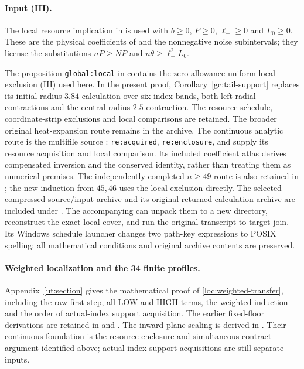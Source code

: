 \documentclass[aop,preprint]{imsart}
\theoremstyle{definition}
\numberwithin{equation}{section}
\begin{document}
\paragraph{Input (III).}
The local resource implication  in
 is used with $b\ge0$, $P\ge0$,
$\ell_-\ge0$ and $L_0\ge0$. These are the physical coefficients of
 and the nonnegative noise subintervals; they license
the substitutions $nP\ge NP$ and $n\theta\ge\ell_-^2L_0$.

The proposition \texttt{global:local} in
contains the zero-allowance uniform local exclusion (III) used here.
In the present proof, Corollary~\ref{gc:tail-support} replaces its
initial radius-$3.84$ calculation over six index bands, both left radial
contractions and the central radius-$2.5$ contraction. The resource
schedule, coordinate-strip exclusions and local comparisons are
retained. The broader original heat-expansion route remains in the archive.
The continuous analytic route is the multifile source
:
\texttt{re:acquired}, \texttt{re:enclosure}, and
 supply its resource acquisition and
local comparison. Its included coefficient atlas derives
compensated inversion and the conserved identity, rather than treating
them as numerical premises. The independently completed $n\ge49$
route is also retained in
;
the new induction from $45,46$ uses the local exclusion directly.
The selected compressed source/input archive and its original returned
calculation archive are included under .
The accompanying  can unpack
them to a new directory, reconstruct the exact local cover, and run
the original transcript-to-target join. Its Windows schedule launcher
changes two path-key expressions to POSIX spelling; all mathematical
conditions and original archive contents are preserved.

\paragraph{Weighted localization and the 34 finite profiles.}
Appendix~\ref{ut:section} gives the mathematical proof of
\eqref{loc:weighted-transfer}, including the raw first step, all LOW and
HIGH terms, the weighted induction and the order of actual-index support
acquisition. The earlier fixed-floor derivations are retained in
and
.
The inward-plane scaling is derived in
.
Their continuous foundation is the resource-enclosure and simultaneous-contract
argument identified above; actual-index support acquisitions are still
separate inputs.
\end{document}

